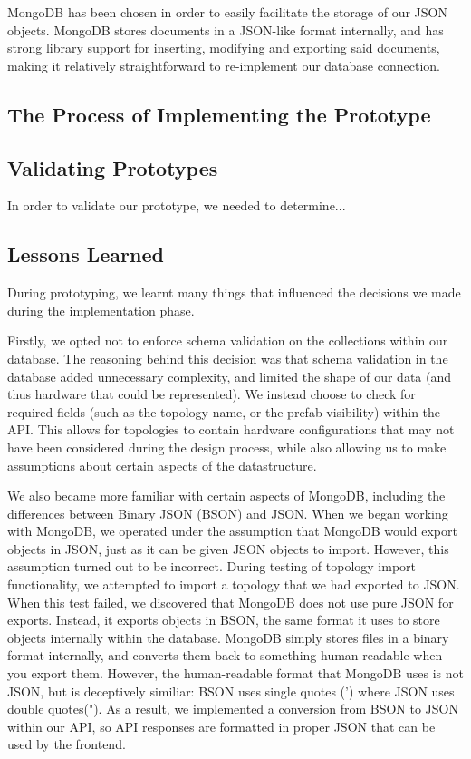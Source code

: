 \documentclass[11pt]{article}
\begin{document}
		MongoDB has been chosen in order to easily facilitate the storage of our JSON objects.
		MongoDB stores documents in a JSON-like format internally, and has strong library support for inserting, modifying and exporting said documents, making it relatively straightforward to re-implement our database connection.
	
	\subsection{The Process of Implementing the Prototype}

	\subsection{Validating Prototypes}
		In order to validate our prototype, we needed to determine...

	\subsection{Lessons Learned}
		During prototyping, we learnt many things that influenced the decisions we made during the implementation phase.

		Firstly, we opted not to enforce schema validation on the collections within our database.
		The reasoning behind this decision was that schema validation in the database added unnecessary complexity, and limited the shape of our data (and thus hardware that could be represented).
		We instead choose to check for required fields (such as the topology name, or the prefab visibility) within the API.
		This allows for topologies to contain hardware configurations that may not have been considered during the design process, while also allowing us to make assumptions about certain aspects of the datastructure.

		We also became more familiar with certain aspects of MongoDB, including the differences between Binary JSON (BSON) and JSON.
		When we began working with MongoDB, we operated under the assumption that MongoDB would export objects in JSON, just as it can be given JSON objects to import.
		However, this assumption turned out to be incorrect. 
		During testing of topology import functionality, we attempted to import a topology that we had exported to JSON.
		When this test failed, we discovered that MongoDB does not use pure JSON for exports.
		Instead, it exports objects in BSON, the same format it uses to store objects internally within the database.
		MongoDB simply stores files in a binary format internally, and converts them back to something human-readable when you export them. 
		However, the human-readable format that MongoDB uses is not JSON, but is deceptively similiar: BSON uses single quotes (') where JSON uses double quotes(").
		As a result, we implemented a conversion from BSON to JSON within our API, so API responses are formatted in proper JSON that can be used by the frontend.
\end{document}
